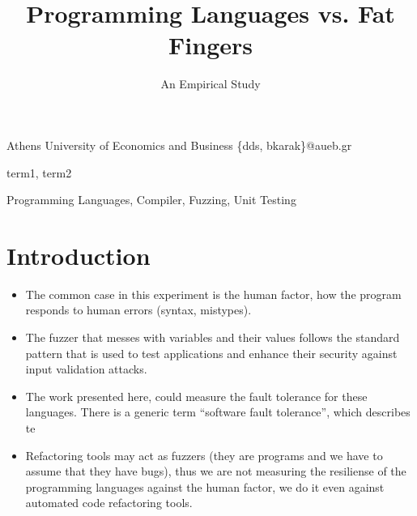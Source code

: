 \documentclass[10pt]{sigplanconf}
\begin{document}
\copyrightdata{[to be supplied]}


\title{Programming Languages vs. Fat Fingers}
\subtitle{An Empirical Study}

           {Athens University of Economics and Business}
           {\{dds, bkarak\}@aueb.gr}

\maketitle

\begin{abstract}
\end{abstract}


\terms
term1, term2

\keywords
Programming Languages, Compiler, Fuzzing, Unit Testing

\section{Introduction} %

\cite{C99}

\begin{itemize}
	\item The common case in this experiment is the human factor, how the program responds to human errors (syntax, mistypes).
	\item The fuzzer that messes with variables and their values follows the standard pattern that is used to test applications and enhance their security against input validation attacks.
	\item The work presented here, could measure the fault tolerance for these languages. There is a generic term ``software fault tolerance'', which describes te
	\item Refactoring tools may act as fuzzers (they are programs and we have to assume that they have bugs), thus we are not measuring the resiliense of the programming languages against the human factor, we do it even against automated code refactoring tools.
\end{itemize}
\end{document}
